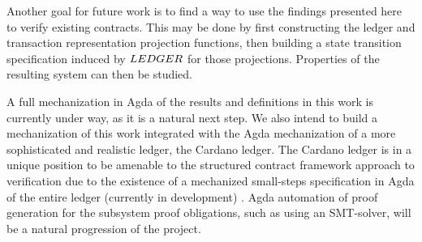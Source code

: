 Another goal for future work is to
find a way to use the findings presented here to verify existing contracts.
This may be done by first constructing the ledger and transaction representation
projection functions, then building a state transition specification induced by
$\LEDGER$ for those projections. Properties of the resulting system can then
be studied.

A full mechanization in Agda of the results and definitions in this work is currently
under way, as it is a natural next step. We also intend to build a mechanization of this work
integrated with the Agda mechanization of a more sophisticated and realistic
ledger, the Cardano ledger. The Cardano
ledger is in a unique position to be amenable to the structured contract framework
approach to verification due to the existence of a mechanized small-steps specification
in Agda of the entire ledger (currently in development) \cite{agdaspec}.
Agda automation of proof generation for the subsystem proof obligations, such
as using an SMT-solver, will be a natural progression of the project.

